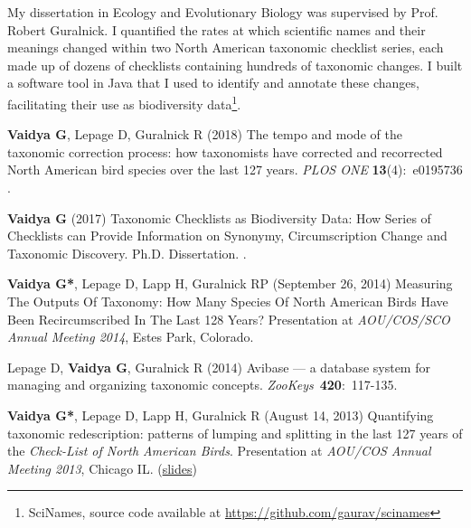 \documentclass[12pt,letter]{article}
\begin{document}
My dissertation in Ecology and Evolutionary Biology was supervised by Prof. Robert Guralnick. I quantified the rates at which scientific names and their meanings changed within two North American taxonomic checklist series, each made up of dozens of checklists containing hundreds of taxonomic changes. I built a software tool in Java that I used to identify and annotate these changes, facilitating their use as biodiversity data\footnote{SciNames, source code available at \url{https://github.com/gaurav/scinames}}.

\begin{publications}

\item \textbf{Vaidya G}, Lepage D, Guralnick R (2018) The tempo and mode of the taxonomic correction process: how taxonomists have corrected and recorrected North American bird species over the last 127 years. \textit{PLOS ONE} \textbf{13}(4):~e0195736 .

\item \textbf{Vaidya G} (2017) Taxonomic Checklists as Biodiversity Data: How Series of Checklists can Provide Information on Synonymy, Circumscription Change and Taxonomic Discovery. Ph.D. Dissertation. .


\item \textbf{Vaidya G*}, Lepage D, Lapp H, Guralnick RP (September 26, 2014) Measuring The Outputs Of Taxonomy: How Many Species Of North American Birds Have Been Recircumscribed In The Last 128 Years? Presentation at \textit{AOU/COS/SCO Annual Meeting 2014}, Estes Park, Colorado.

\item Lepage D, \textbf{Vaidya G}, Guralnick R (2014) Avibase --- a database system for managing and organizing taxonomic concepts. \textit{ZooKeys}~\textbf{420}:~117-135. 

\item \textbf{Vaidya G*}, Lepage D, Lapp H, Guralnick R (August 14, 2013) Quantifying taxonomic redescription: patterns of lumping and splitting in the last 127 years of the \textit{Check-List of North American Birds}. Presentation at \textit{AOU/COS Annual Meeting 2013}, Chicago IL. (\href{https://speakerdeck.com/gaurav/quantifying-taxonomic-redescription-patterns-of-lumping-and-splitting-in-the-last-127-years-of-the-check-list-of-north-american-birds}{slides})


\end{publications}
\end{document}
